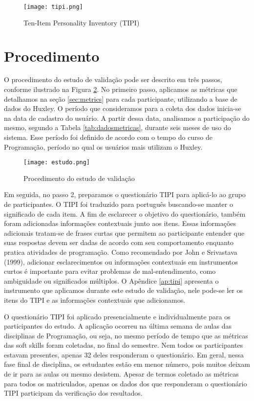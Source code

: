 \begin{figure}[ht]
\centering
\caption{\small Ten-Item Personality Inventory (TIPI)}
\texttt{[image: tipi.png]}
\label{fig:tipi}
\end{figure}

\section{Procedimento}
\label{sec:procedimento}

O procedimento do estudo de validação pode ser descrito em três passos, conforme ilustrado na Figura \ref{fig:estudo}.
No primeiro passo, aplicamos as métricas que detalhamos na seção \ref{sec:metrics} para cada participante, utilizando a base de dados do Huxley. O período que consideramos para a coleta dos dados inicia-se na data de cadastro do usuário. A partir dessa data, analisamos a participação do mesmo, segundo a Tabela \ref{tab:dadosmetricas}, durante seis meses de uso do sistema. Esse período foi definido de acordo com o tempo do curso de Programação, período no qual os usuários mais utilizam o Huxley.%

\begin{figure}[ht]
\centering
\caption{\small Procedimento do estudo de validação} 
\texttt{[image: estudo.png]}
\label{fig:estudo}
\end{figure}

Em seguida, no passo 2, preparamos o questionário TIPI para aplicá-lo ao grupo de participantes. O TIPI foi traduzido para português buscando-se manter o significado de cada item. A fim de esclarecer o objetivo do questionário, também foram adicionadas informações contextuais junto aos itens. Essas informações adicionais tratam-se de frases curtas que permitem ao participante entender que suas respostas devem ser dadas de acordo com seu comportamento enquanto pratica atividades de programação. Como recomendado por John e Srivastava (1999)\nocite{john:99}, adicionar esclarecimentos ou informações contextuais em instrumentos curtos é importante para evitar problemas de mal-entendimento, como ambiguidade ou significados múltiplos.
O Apêndice \ref{ap:tipi} apresenta o instrumento que aplicamos durante este estudo de validação, nele pode-se ler os itens do TIPI e as informações contextuais que adicionamos.

O questionário TIPI foi aplicado presencialmente e individualmente para os participantes do estudo. A aplicação ocorreu na última semana de aulas das disciplinas de Programação, ou seja, no mesmo período de tempo que as métricas das soft skills foram coletadas, no final do semestre. Nem todos os participantes estavam presentes, apenas 32 deles responderam o questionário. Em geral, nessa fase final de disciplina, os estudantes estão em menor número, pois muitos deixam de ir para as aulas ou mesmo desistem. Apesar de termos coletado as métricas para todos os matriculados, apenas os dados dos que responderam o questionário TIPI participam da verificação dos resultados.


